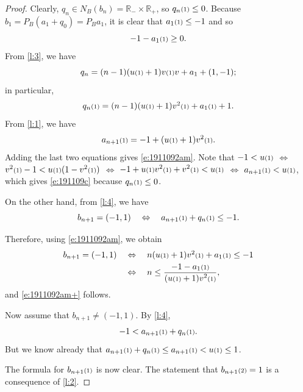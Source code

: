 \documentclass[12pt]{article}
\newcommand{\RP}{\ensuremath{\mathbb{R}_+}}
\newcommand{\RM}{\ensuremath{\mathbb{R}_-}}
\newcommand{\kkk}[1]{\ensuremath{\textstyle\mathsmaller{({#1})}}}
\begin{document}
\begin{proof}
Clearly, $q_n \in N_B(b_n) = \RM\times \RP$, so $q_n\kkk{1}\leq 0$. 
Because $b_1 = P_B(a_1+q_0)=P_Ba_1$, it is clear that $a_1\kkk{1}\leq -1$ and so 
\begin{equation}
  -1-a_1\kkk{1}\geq 0.
\end{equation}
From \cref{l:3}, we have 
\begin{equation}
q_n = (n-1)(u\kkk{1}+1)v\kkk{1}v + a_1+(1,-1);
\end{equation}
in particular, 
\begin{equation}
q_n\kkk{1} = (n-1)(u\kkk{1}+1)v^2\kkk{1} + a_1\kkk{1}+1. 
\end{equation}
From \cref{l:1}, we have 
\begin{equation}
  a_{n+1}\kkk{1}= -1+(u\kkk{1}+1)v^2\kkk{1}.
\end{equation}
Adding the last two equations gives \eqref{e:1911092am}.
Note that $-1 < u\kkk{1}$
$\Leftrightarrow$
$v^2\kkk{1}-1 < u\kkk{1}(1-v^2\kkk{1})$
$\Leftrightarrow$
$-1+u\kkk{1}v^2\kkk{1}+v^2\kkk{1} < u\kkk{1}$
$\Leftrightarrow$
$a_{n+1}\kkk{1}<u\kkk{1}$, which gives
\eqref{e:191109c} because $q_n\kkk{1}\leq 0$. 
  
On the other hand, from \cref{l:4}, we have
\begin{equation}
b_{n+1} = (-1,1)
\quad\Leftrightarrow\quad
a_{n+1}\kkk{1}+ q_n\kkk{1} \leq -1.
\end{equation}

Therefore, using \eqref{e:1911092am}, we obtain 
\begin{subequations}
\begin{align}
b_{n+1} = (-1,1)
&\quad\Leftrightarrow\quad
n(u\kkk{1}+1)v^2\kkk{1} + a_1\kkk{1} \leq -1\\
&\quad\Leftrightarrow\quad
n \leq \frac{-1-a_1\kkk{1}}{(u\kkk{1}+1)v^2\kkk{1}},
\end{align}
\end{subequations}
and \eqref{e:1911092am+} follows.


Now assume that $b_{n+1} \neq (-1,1)$.
By \cref{l:4}, 
\begin{equation}
 -1< a_{n+1}\kkk{1}+q_n\kkk{1}.
\end{equation}
But we know already that 
$a_{n+1}\kkk{1}+q_n\kkk{1} \leq a_{n+1}\kkk{1}<u\kkk{1}\leq 1$.

The formula for $b_{n+1}\kkk{1}$ is now clear. 
The statement that $b_{n+1}\kkk{2}=1$ is a consequence of \cref{l:2}. 
\end{proof}
\end{document}
